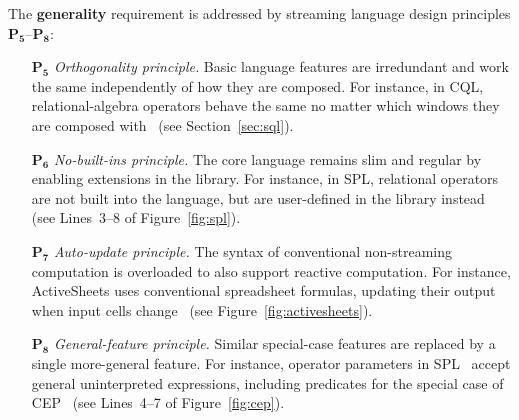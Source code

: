 The \textbf{generality} requirement is addressed by streaming language
design principles $\mathbf{P_5}$--$\mathbf{P_8}$:
\begin{itemize}[leftmargin=6mm]
  \item[$\mathbf{P_5}$] \emph{Orthogonality principle.} Basic language
    features are irredundant and work the same independently of how
    they are composed. For instance, in CQL, relational-algebra
    operators behave the same no matter which windows they are
    composed with~\cite{arasu_babu_widom_2006} (see
    Section~\ref{sec:sql}).
  \item[$\mathbf{P_6}$] \emph{No-built-ins principle.} The core language
    remains slim and regular by enabling extensions in the library. For
    instance, in SPL, relational operators are not built into the
    language, but are user-defined in the library
    instead~\cite{hirzel_schneider_gedik_2017} (see \mbox{Lines 3--8}
    of Figure~\ref{fig:spl}).
  \item[$\mathbf{P_7}$] \emph{Auto-update principle.} The syntax of
    conventional non-streaming computation is overloaded to also
    support reactive computation. For instance, ActiveSheets uses
    conventional spreadsheet formulas, updating their output when
    input cells change~\cite{vaziri_et_al_2014} (see
    Figure~\ref{fig:activesheets}).
  \item[$\mathbf{P_8}$] \emph{General-feature principle.} Similar
    special-case features are replaced by a single more-general
    feature. For instance, operator parameters in
    SPL~\cite{hirzel_schneider_gedik_2017} accept general
    uninterpreted expressions, including predicates for the special
    case of CEP~\cite{hirzel_2012} (see \mbox{Lines 4--7} of
    Figure~\ref{fig:cep}).
\end{itemize}

